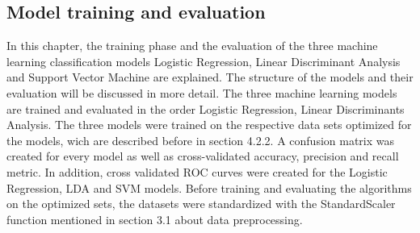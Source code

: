 \documentclass[../masterarbeit.tex]{subfiles}
\begin{document}
	




\subsection{Model training and evaluation}
In this chapter, the training phase and the evaluation of the three machine learning classification models Logistic Regression, Linear Discriminant Analysis and Support Vector Machine are explained. The structure of the models and their evaluation will be discussed in more detail. The three machine learning models are trained and evaluated in the order Logistic Regression, Linear Discriminants Analysis. The three models were trained on the respective data sets optimized for the models, wich are described before in section 4.2.2. A confusion matrix was created for every model as well as cross-validated accuracy, precision and recall metric. In addition, cross validated ROC curves were created for the Logistic Regression, LDA and SVM models. Before training and evaluating the algorithms on the optimized sets, the datasets were standardized with the StandardScaler \textcite[]{Sklearn_StandardScaler:2022} function mentioned in section 3.1 about data preprocessing.  \\~\\
\end{document}
